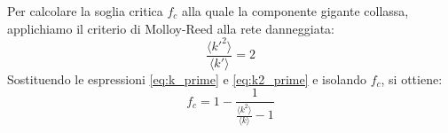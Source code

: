 \documentclass[12pt,italian]{article}
\begin{document}
Per calcolare la soglia critica $f_c$ alla quale la componente gigante collassa, applichiamo il criterio di Molloy-Reed alla rete danneggiata:
\begin{equation}
    \frac{\langle k'^2 \rangle}{\langle k' \rangle} = 2
\end{equation}
Sostituendo le espressioni \eqref{eq:k_prime} e \eqref{eq:k2_prime} e isolando $f_c$, si ottiene:
\begin{equation}
    f_c = 1 - \frac{1}{\frac{\langle k^2 \rangle}{\langle k \rangle} - 1}
    \label{eq:fc_general}
\end{equation}

\printbibliography[heading=bibintoc, title={Bibliografia}]
\end{document}
